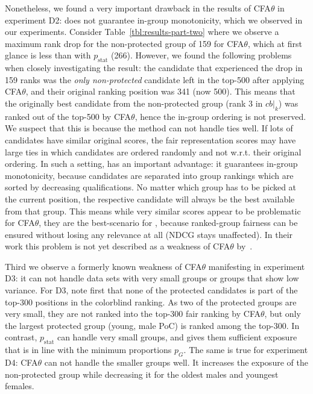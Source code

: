 Nonetheless, we found a very important drawback in the results of CFA$\theta$ in experiment D2: \citet{zehlike2020matching} does not guarantee in-group monotonicity, which we observed in our experiments.
%
Consider Table~\ref{tbl:results-part-two} where we observe a maximum rank drop for the non-protected group of 159 for CFA$\theta$, which at first glance is less than \algoFAIR with $p_{\text{stat}}$ (266).
%
However, we found the following problems when closely investigating the result: the candidate that experienced the drop in 159 ranks was the \emph{only non-protected} candidate left in the top-500 after applying CFA$\theta$, and their original ranking position was 341 (now 500).
%
This means that the originally best candidate from the non-protected group (rank 3 in $cb|_k$) was ranked out of the top-500 by CFA$\theta$, hence the in-group ordering is not preserved.
%
We suspect that this is because the method can not handle ties well.
%
If lots of candidates have similar original scores, the fair representation scores may have large ties in which candidates are ordered randomly and not w.r.t. their original ordering.
%
In such a setting, \algoFAIR has an important advantage: it guarantees in-group monotonicity, because candidates are separated into group rankings which are sorted by decreasing qualifications.
%
No matter which group has to be picked at the current position, the respective candidate will always be the best available from that group.
%
This means while very similar scores appear to be problematic for CFA$\theta$, they are the best-scenario for \algoFAIR, because ranked-group fairness can be ensured without losing any relevance at all (NDCG stays unaffected).
%
In their work this problem is not yet described as a weakness of CFA$\theta$ by~\citet{zehlike2020matching}.

Third we observe a formerly known weakness of CFA$\theta$ manifesting in experiment D3: it can not handle data sets with very small groups or groups that show low variance.
%
For D3, note first that none of the protected candidates is part of the top-300 positions in the colorblind ranking.
%
As two of the protected groups are very small, they are not ranked into the top-300 fair ranking by CFA$\theta$, but only the largest protected group (young, male PoC) is ranked among the top-300.
%
In contrast, \algoFAIR $p_{\text{stat}}$ can handle very small groups, and gives them sufficient exposure that is in line with the minimum proportions $p_G$.
%
The same is true for experiment D4: CFA$\theta$ can not handle the smaller groups well.
%
It increases the exposure of the non-protected group while decreasing it for the oldest males and youngest females.

